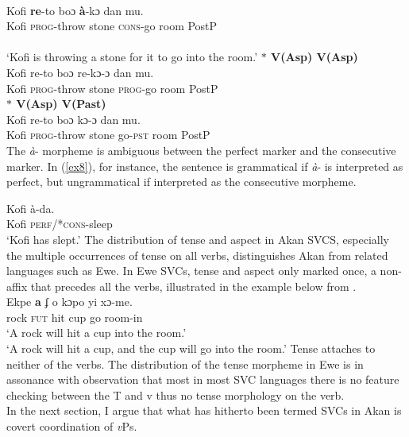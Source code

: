\documentclass[output=paper,colorlinks,citecolor=brown]{langscibook}
\begin{document}
\ea\label{ex4} 
 \\
\gll Kofi \textbf{re}-to boɔ \textbf{\`a}-kɔ dan mu.\\
	Kofi \textsc{prog}-throw stone \textsc{cons}-go room  PostP\\
	 \\
\glt `Kofi is throwing a stone for it to go into the room.'
\z 
\ex\label{ex05}
\textbf{$\ast$ \phantom {} {} {}  V(Asp)\phantom {} {} {}   V(Asp)} 
     \ea\label{ex07} 
 \\
\gll * Kofi re-to boɔ re-kɔ-ɔ dan mu.\\
	{} Kofi \textsc{prog}-throw  stone  \textsc{prog}-go room PostP\\
\z 
\ex\label{ex005}
\textbf{$\ast$ \phantom {} {} {}  V(Asp)\phantom {} {} {}   V(Past)} 
     \ea\label{ex7} 
 \\
\gll * Kofi re-to boɔ kɔ-ɔ dan mu.\\
	{} Kofi \textsc{prog}-throw  stone  go-\textsc{pst} room PostP\\
\z 
\z \z 
The \emph{\`a}- morpheme is ambiguous between the perfect marker and the consecutive marker. In (\ref{ex8}), for instance, the sentence is grammatical if \emph{\`a}- is interpreted as perfect, but ungrammatical if interpreted as the consecutive morpheme.

\ea \label{ex8}
 \gll Kofi \`a-da.\\
	Kofi \textsc{perf}/*\textsc{cons}-sleep\\
	\glt `Kofi has slept.'
\z The distribution of tense and aspect in Akan SVCS, especially the multiple occurrences of tense on all verbs, distinguishes Akan from related languages such as Ewe. In Ewe SVCs, tense and aspect only marked once, a non-affix that precedes all the verbs, illustrated in the example below from \cite{Collins1997}.
\ea \label{ex0)} 
 \\
\gll Ekpe \textbf{a} ʄ o kɔpo yi xɔ-me.\\
rock {\textsc{fut}} hit cup go room-in\\
\glt `A rock will hit a cup into the room.'\\
`A rock will hit a cup, and the cup will go into the room.' 
\z Tense attaches to neither of the verbs. The distribution of the tense morpheme in Ewe is in assonance with  observation that most in most SVC languages there is no feature checking between the T and v thus no tense morphology on the verb.\\
In the next section, I argue that what has hitherto been termed SVCs in Akan is covert coordination of \emph{v}Ps.
\end{document}
